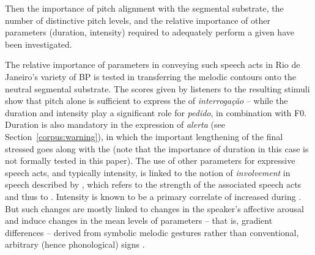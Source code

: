 \documentclass[output=paper]{LSP/langsci}
\begin{document}
Then the importance of pitch alignment with the segmental substrate, the number of distinctive pitch levels, and the relative importance of other  parameters (duration, intensity) required to adequately perform a given  have been investigated.

The relative importance of  parameters in conveying such speech acts in Rio de Janeiro’s variety of BP is tested in transferring the melodic contours onto the neutral segmental substrate. 
The scores given by listeners to the resulting stimuli show that pitch alone is sufficient to express the  of \textit{interrogação} -- while the duration and intensity play a significant role for \textit{pedido}, in combination with F0. 
Duration is also mandatory in the expression of \textit{alerta} (see Section~\ref{corpus:warning}), in which the important lengthening of the final stressed  goes along with the  (note that the importance of duration in this case is not formally tested in this paper). 
The use of other parameters for expressive speech acts, and typically intensity, is linked to the notion of \textit{involvement} in speech described by \citet{danes1994involvement}, which refers to the  strength of the associated speech acts and thus to  \citep{Gussenhoven2004}. 
Intensity is known to be a primary correlate of increased  during  \citep{Lienard1999,Traunmuller2000}. 
But such changes are mostly linked to changes in the speaker's affective arousal \citep{Goudbeek2010} and induce changes in the mean levels of parameters -- that is, gradient differences -- derived from symbolic melodic gestures rather than conventional, arbitrary (hence phonological) signs \citep[cf.][]{bolinger1986intonation}.
\end{document}
